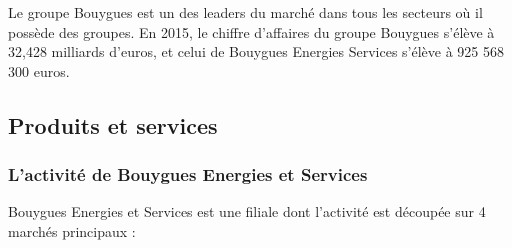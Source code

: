 \documentclass[a4paper]{article}
\begin{document}
    Le groupe Bouygues est un des leaders du marché dans tous les secteurs où il possède des groupes. En 2015, le chiffre d’affaires du groupe Bouygues s’élève à 32,428 milliards d’euros, et celui de Bouygues Energies Services s'élève à 925 568 300 euros. \\

    \subsection{Produits et services}
 
    \subsubsection{L'activité de Bouygues Energies et Services}
    Bouygues Energies et Services est une filiale dont l'activité est découpée sur 4 marchés principaux : \\
    
\end{document}
